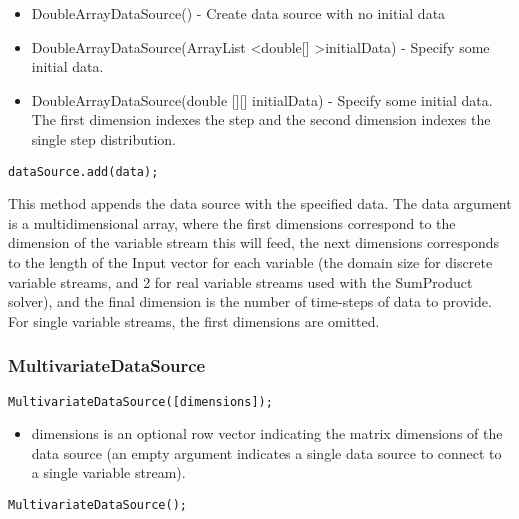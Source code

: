 \ifjava
\begin{itemize}
\item DoubleArrayDataSource() - Create data source with no initial data
\item DoubleArrayDataSource(ArrayList \textless double[] \textgreater  initialData) - Specify some initial data. 
\item DoubleArrayDataSource(double [][] initialData) - Specify some initial data.  The first dimension indexes the step and the second dimension indexes the single step distribution.
\end{itemize}
\fi



\begin{lstlisting}
dataSource.add(data);
\end{lstlisting}

This method appends the data source with the specified data.  The data argument is a multidimensional array, where the first dimensions correspond to the dimension of the variable stream this will feed, the next dimensions corresponds to the length of the Input vector for each variable (the domain size for discrete variable streams, and 2 for real variable streams used with the SumProduct solver), and the final dimension is the number of time-steps of data to provide.  For single variable streams, the first dimensions are omitted.

\subsubsection{MultivariateDataSource}


\ifmatlab
\begin{lstlisting}
MultivariateDataSource([dimensions]);
\end{lstlisting}

\begin{itemize}
\item dimensions is an optional row vector indicating the matrix dimensions of the data source (an empty argument indicates a single data source to connect to a single variable stream).
\end{itemize}
\fi

\ifjava
\begin{lstlisting}
MultivariateDataSource();
\end{lstlisting}
\fi


